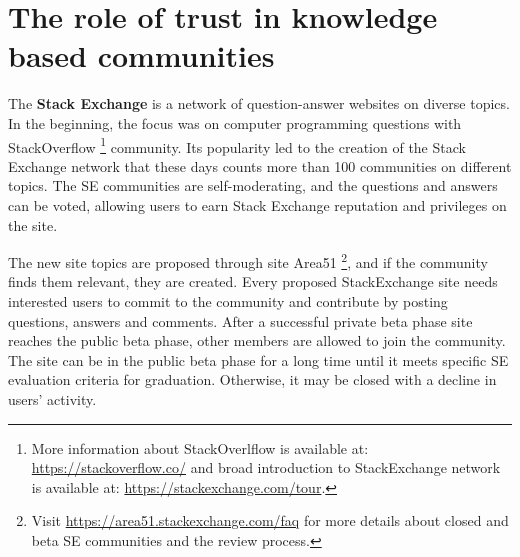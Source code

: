 
\chapter{The role of trust in knowledge based communities} %
\label{ChapterTrust}


The \textbf{Stack Exchange} is a network of question-answer websites on diverse topics. In the beginning, the focus was on computer programming questions with StackOverflow \footnote{
	More information about StackOverlflow is available at: \url{https://stackoverflow.co/} and broad introduction to StackExchange network is available at: \url{https://stackexchange.com/tour}. 
}  community. Its popularity led to the creation of the Stack Exchange network that these days counts more than 100 communities on different topics. The SE communities are self-moderating, and the questions and answers can be voted, allowing users to earn Stack Exchange reputation and privileges on the site. 

The new site topics are proposed through site Area51 \footnote{Visit \url{https://area51.stackexchange.com/faq} for more details about closed and beta SE communities and the review process.}, and if the community finds them relevant, they are created. Every proposed  StackExchange site needs interested users to commit to the community and contribute by posting questions, answers and comments. After a successful private beta phase site reaches the public beta phase, other members are allowed to join the community. The site can be in the public beta phase for a long time until it meets specific SE evaluation criteria for graduation. Otherwise, it may be closed with a decline in users' activity. 

